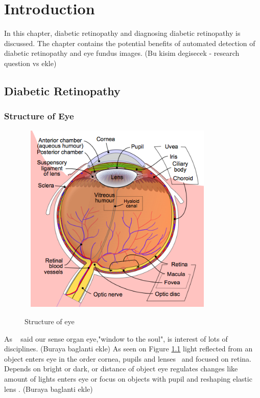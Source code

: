 \chapter{Introduction}
\label{intro}

In this chapter, diabetic retinopathy and diagnosing diabetic retinopathy is discussed. The chapter contains the potential benefits of automated detection of diabetic retinopathy and eye fundus images.  (Bu kisim degisecek - research question vs ekle)

\section{Diabetic Retinopathy}


\subsection{Structure of Eye}

\begin{figure}[t]
\caption{Structure of eye}~\cite{WikipediaEN:AFM}
\label{structureOfEye}
\centering
\includegraphics[width=0.8\textwidth]{Figures/structure_of_eye}
\end{figure}

As ~\cite{hughes2004anatomy} said our sense organ eye,"window to the soul", is interest of lots of disciplines. (Buraya baglanti ekle) As seen on Figure \ref{structureOfEye} light reflected from an object enters eye in the order cornea, pupils and lenses~\cite{falt2012modern} and focused on retina. Depends on bright or dark, or distance of object eye regulates changes like amount of lights enters eye or focus on objects with pupil and reshaping elastic lens \cite{kauppi2010eye}. (Buraya baglanti ekle)

